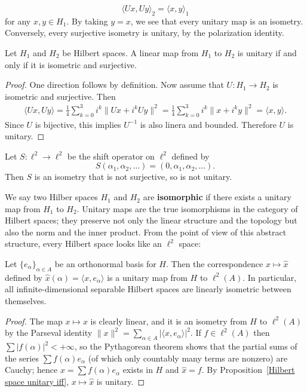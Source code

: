 \[\langle Ux,Uy\rangle_2=\langle x,y\rangle_1\]
for any $x,y\in H_1$. By taking $y=x$, we see that every unitary map is an isometry. Conversely, every surjective isometry is unitary, by the polarization identity.
\begin{proposition}\label{Hilbert space unitary iff}
Let $H_1$ and $H_2$ be Hilbert spaces. A linear map from $H_1$ to $H_2$ is unitary if and only if it is isometric and surjective.
\end{proposition}
\begin{proof}
One direction follows by definition. Now assume that $U:H_1\to H_2$ is isometric and surjective. Then
\begin{align*}
\langle Ux,Uy\rangle=\frac{1}{4}\sum_{k=0}^{3}i^k\|Ux+i^k Uy\|^2=\frac{1}{4}\sum_{k=0}^{3}i^k\|x+i^ky\|^2=\langle x,y\rangle.
\end{align*}
Since $U$ is bijective, this implies $U^{-1}$ is also linera and bounded. Therefore $U$ is unitary.
\end{proof}
\begin{example}\label{shift operator on ell^2}
Let $S:\ell^2\to\ell^2$ be the shift operator on $\ell^2$ defined by
\[S(\alpha_1,\alpha_2,\dots)=(0,\alpha_1,\alpha_2,\dots).\]
Then $S$ is an isometry that is not surjective, so is not unitary.
\end{example}
We say two Hilber spaces $H_1$ and $H_2$ are \textbf{isomorphic} if there exists a unitary map from $H_1$ to $H_2$. Unitary maps are the true isomorphisms in the category of Hilbert spaces; they preserve not only the linear structure and the topology but also the norm and the inner product. From the point of view of this abstract structure, every Hilbert space looks like an $\ell^2$ space:
\begin{theorem}
Let $\{e_{\alpha}\}_{\alpha\in A}$ be an orthonormal basis for $H$. Then the correspondence $x\mapsto\widehat{x}$ defined by $\widehat{x}(\alpha)=\langle x,e_{\alpha}\rangle$ is a unitary map from $H$ to $\ell^2(A)$. In particular, all infinite-dimensional separable Hilbert spaces are linearly isometric between themselves.
\end{theorem}
\begin{proof}
The map $x\mapsto x$ is clearly linear, and it is an isometry from $H$ to $\ell^2(A)$ by the Parseval identity $\|x\|^2=\sum_{\alpha\in A}|\langle x,e_{\alpha}\rangle|^2$. If $f\in\ell^2(A)$ then $\sum|f(\alpha)|^2<+\infty$, so the Pythagorean theorem shows that the partial sums of the series $\sum f(\alpha)e_{\alpha}$ (of which only countably many terms are nonzero) are Cauchy; hence $x=\sum f(\alpha)e_{\alpha}$ exists in $H$ and $\widehat{x}=f$. By Proposition~\ref{Hilbert space unitary iff}, $x\mapsto\widehat{x}$ is unitary.
\end{proof}
